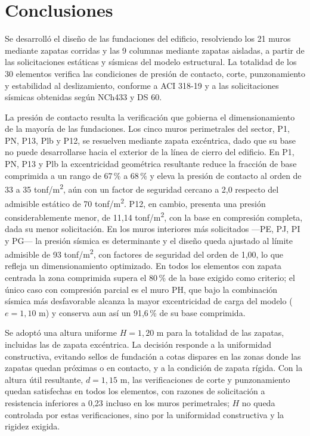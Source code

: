 \section{Conclusiones}

Se desarrolló el diseño de las fundaciones del edificio, resolviendo los 21 muros mediante zapatas
corridas y las 9 columnas mediante zapatas aisladas, a partir de las solicitaciones estáticas y
sísmicas del modelo estructural. La totalidad de los 30 elementos verifica las condiciones de
presión de contacto, corte, punzonamiento y estabilidad al deslizamiento, conforme a ACI 318-19 y
a las solicitaciones sísmicas obtenidas según NCh433 y DS 60.

La presión de contacto resulta la verificación que gobierna el dimensionamiento de la mayoría de
las fundaciones. Los cinco muros perimetrales del sector, P1, PN, P13, Plb y P12, se resuelven
mediante zapata excéntrica, dado que su base no puede desarrollarse hacia el exterior de la línea
de cierro del edificio. En P1, PN, P13 y Plb la excentricidad geométrica resultante reduce la
fracción de base comprimida a un rango de 67\,\% a 68\,\% y eleva la presión de contacto al orden
de 33 a 35 tonf/m\textsuperscript{2}, aún con un factor de seguridad cercano a 2,0 respecto del
admisible estático de 70 tonf/m\textsuperscript{2}. P12, en cambio, presenta una presión
considerablemente menor, de 11,14 tonf/m\textsuperscript{2}, con la base en compresión completa,
dada su menor solicitación. En los muros interiores más solicitados —PE, PJ, PI y PG— la presión
sísmica es determinante y el diseño queda ajustado al límite admisible de 93 tonf/m\textsuperscript{2},
con factores de seguridad del orden de 1,00, lo que refleja un dimensionamiento optimizado. En
todos los elementos con zapata centrada la zona comprimida supera el 80\,\% de la base exigido
como criterio; el único caso con compresión parcial es el muro PH, que bajo la combinación sísmica
más desfavorable alcanza la mayor excentricidad de carga del modelo ($e = 1,10$ m) y conserva aun
así un 91,6\,\% de su base comprimida.

Se adoptó una altura uniforme $H = 1,20$ m para la totalidad de las zapatas, incluidas las de
zapata excéntrica. La decisión responde a la uniformidad constructiva, evitando sellos de
fundación a cotas dispares en las zonas donde las zapatas quedan próximas o en contacto, y a la
condición de zapata rígida. Con la altura útil resultante, $d = 1,15$ m, las verificaciones de
corte y punzonamiento quedan satisfechas en todos los elementos, con razones de solicitación a
resistencia inferiores a 0,23 incluso en los muros perimetrales; $H$ no queda controlada por estas
verificaciones, sino por la uniformidad constructiva y la rigidez exigida.


